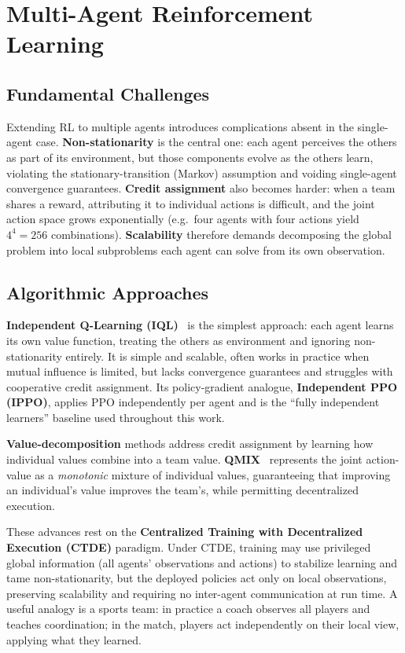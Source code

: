\section{Multi-Agent Reinforcement Learning}

\subsection{Fundamental Challenges}
Extending RL to multiple agents introduces complications absent in the
single-agent case. \textbf{Non-stationarity} is the central one: each agent
perceives the others as part of its environment, but those components evolve as the
others learn, violating the stationary-transition (Markov) assumption and voiding
single-agent convergence guarantees. \textbf{Credit assignment} also becomes
harder: when a team shares a reward, attributing it to individual actions is
difficult, and the joint action space grows exponentially (e.g.\ four agents with
four actions yield $4^4 = 256$ combinations). \textbf{Scalability} therefore
demands decomposing the global problem into local subproblems each agent can solve
from its own observation.

\subsection{Algorithmic Approaches}
\textbf{Independent Q-Learning (IQL)}~\cite{tan1993iql} is the simplest approach:
each agent learns its own value function, treating the others as environment and
ignoring non-stationarity entirely. It is simple and scalable, often works in
practice when mutual influence is limited, but lacks convergence guarantees and
struggles with cooperative credit assignment. Its policy-gradient analogue,
\textbf{Independent PPO (IPPO)}, applies PPO independently per agent and is the
``fully independent learners'' baseline used throughout this work.

\textbf{Value-decomposition} methods address credit assignment by learning how
individual values combine into a team value. \textbf{QMIX}~\cite{rashid2018qmix}
represents the joint action-value as a \emph{monotonic} mixture of individual
values, guaranteeing that improving an individual's value improves the team's,
while permitting decentralized execution.

These advances rest on the \textbf{Centralized Training with Decentralized
Execution (CTDE)} paradigm. Under CTDE, training may use privileged global
information (all agents' observations and actions) to stabilize learning and tame
non-stationarity, but the deployed policies act only on local observations,
preserving scalability and requiring no inter-agent communication at run time. A
useful analogy is a sports team: in practice a coach observes all players and
teaches coordination; in the match, players act independently on their local view,
applying what they learned.

